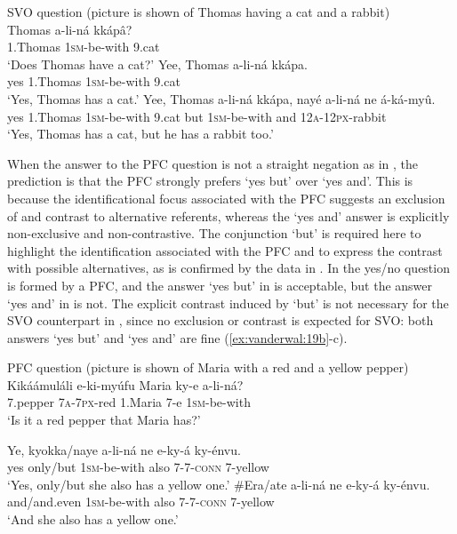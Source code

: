 \documentclass[output=paper]{langsci/langscibook}
\begin{document}
\ea\label{ex:vanderwal:17}SVO question
       (picture is shown of Thomas having a cat and a rabbit)\\
\ea\label{ex:vanderwal:17a}
\gll   Thomas  a-li-ná  kkápâ?\\
       1.Thomas  \textsc{1sm}-be-with  9.cat\\
\glt   ‘Does Thomas have a cat?’
\ex\label{ex:vanderwal:17b}
\gll   Yee,   Thomas  a-li-ná  kkápa.\\
       yes  1.Thomas  \textsc{1sm}-be-with  9.cat\\
\glt   ‘Yes, Thomas has a cat.’
\ex\label{ex:vanderwal:17c}
\gll     Yee,  Thomas    a-li-ná    kkápa,  nayé  a-li-ná    ne  á-ká-myû.\\
       yes  1.Thomas  \textsc{1sm}-be-with  9.cat   but    \textsc{1sm}-be-with  and  \textsc{12a}-\textsc{12px}-rabbit\\
\glt   ‘Yes, Thomas has a cat, but he has a rabbit too.’
\z
\z

When the answer to the PFC question is not a straight negation as in , the prediction is that the PFC strongly prefers ‘yes but’ over ‘yes and’. This is because the identificational focus associated with the PFC suggests an exclusion of and contrast to alternative referents, whereas the ‘yes and’ answer is explicitly non-exclusive and non-contrastive. The conjunction ‘but’ is required here to highlight the identification associated with the PFC and to express the contrast with possible alternatives, as is confirmed by the data in . In  the yes/no question is formed by a PFC, and the answer ‘yes but’ in  is acceptable, but the answer ‘yes and’ in  is not. The explicit contrast induced by ‘but’ is not necessary for the SVO counterpart in , since no exclusion or contrast is expected for SVO: both answers ‘yes but’ and ‘yes and’ are fine (\ref{ex:vanderwal:19b}-c).

\ea\label{ex:vanderwal:18}PFC question
     (picture is shown of Maria with a red and a yellow pepper)\\
\ea\label{ex:vanderwal:18a}
\gll     Kikáámuláli  e-ki-myúfu  Maria    ky-e  a-li-ná?\\
         7.pepper  \textsc{7a}-\textsc{7px}-red  1.Maria  7-e  \textsc{1sm}-be-with\\
\glt     ‘Is it a red pepper that Maria has?’

\ex\label{ex:vanderwal:18b}
\gll     Ye,  kyokka/naye  a-li-ná  ne  e-ky-á    ky-énvu.\\
         yes  only/but  \textsc{1sm}-be-with  also  \textsc{7}-\textsc{7}-\textsc{conn}  7-yellow\\
\glt     ‘Yes, only/but she also has a yellow one.’
\ex\label{ex:vanderwal:18c}
\gll   \#Era/ate  a-li-ná  ne  e-ky-á    ky-énvu.\\
          and/and.even  \textsc{1sm}-be-with  also  \textsc{7}-\textsc{7}-\textsc{conn}  7-yellow\\
\glt     ‘And she also has a yellow one.’
\z
\z
\end{document}
